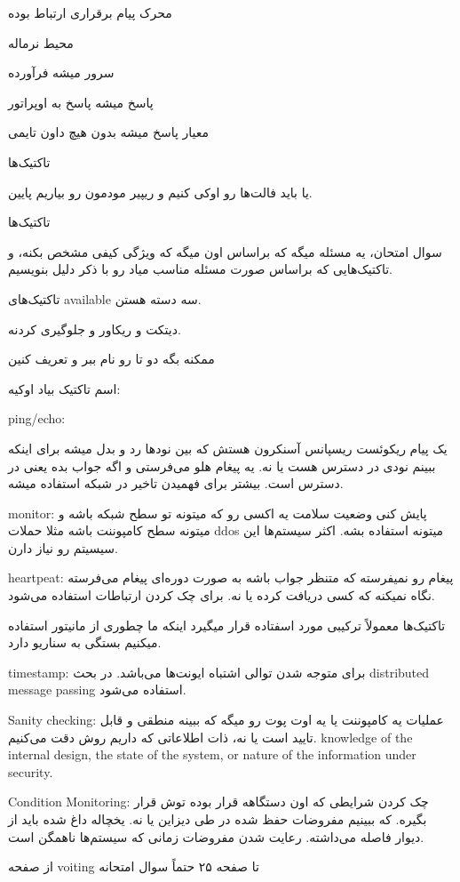 محرک پیام برقراری ارتباط بوده

محیط نرماله

سرور میشه فرآورده

پاسخ میشه پاسخ به اوپراتور

معیار پاسخ میشه بدون هیچ داون تایمی

تاکتیک‌ها

یا باید فالت‌ها رو اوکی کنیم و ریپیر مودمون رو بیاریم پایین.

تاکتیک‌ها

سوال امتحان، یه مسئله میگه که براساس اون میگه که ویژگی کیفی مشخص بکنه، و
تاکتیک‌هایی که براساس صورت مسئله مناسب میاد رو با ذکر دلیل بنویسیم.

تاکتیک‌های available سه دسته هستن.

دیتکت و ریکاور و جلوگیری کردنه. 

ممکنه بگه دو تا رو نام ببر و تعریف کنین

اسم تاکتیک بیاد اوکیه: 

ping/echo: 

یک پیام ریکوئست ریسپانس آسنکرون هستش که بین نود‌ها رد و بدل میشه برای اینکه
ببینم نودی در دسترس هست یا نه. یه پیغام هلو می‌فرستی و اگه جواب بده یعنی در
دسترس است. بیشتر برای فهمیدن تاخیر در شبکه استفاده میشه.

monitor: پایش کنی وضعیت سلامت یه اکسی رو که میتونه تو سطح شبکه باشه و میتونه سطح
کامپوننت باشه مثلا حملات ddos میتونه استفاده بشه. اکثر سیستم‌ها این سیسیتم رو
نیاز دارن.

heartpeat: پیغام رو نمیفرسته که متنظر جواب باشه به صورت دوره‌ای پیغام می‌فرسته
نگاه نمیکنه که کسی دریافت کرده یا نه. برای چک کردن ارتباطات استفاده می‌شود.

تاکتیک‌ها معمولاً ترکیبی مورد اسفتاده قرار میگیرد اینکه ما چطوری از مانیتور
استفاده میکنیم بستگی به سناریو دارد.

timestamp: برای متوجه شدن توالی اشتباه ایونت‌ها می‌باشد. در بحث distributed
message passing استفاده می‌شود.

Sanity checking: عملیات یه کامپوننت یا یه اوت پوت رو میگه که ببینه منطقی و قابل
تایید است یا نه، ذات اطلاعاتی که داریم روش دقت می‌کنیم. knowledge of the
internal design, the state of the system, or nature of the information under
security.

Condition Monitoring: چک کردن شرایطی که اون دستگاهه قرار بوده توش قرار بگیره. که
ببینیم مفروضات حفظ شده در طی دیزاین یا نه. یخچاله داغ شده باید از دیوار فاصله
می‌داشته. رعایت شدن مفروضات زمانی که سیستم‌ها ناهمگن است.

از صفحه voiting تا صفحه ۲۵ حتماً سوال امتحانه

